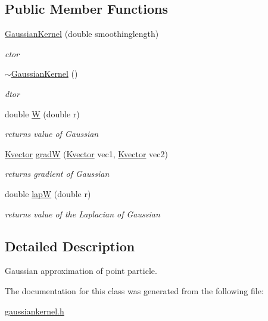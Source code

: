\subsection*{\-Public \-Member \-Functions}
\begin{DoxyCompactItemize}
\item 
\hypertarget{classGaussianKernel_a35f271df46c73b532d7610c4b374b8d5}{\hyperlink{classGaussianKernel_a35f271df46c73b532d7610c4b374b8d5}{\-Gaussian\-Kernel} (double smoothinglength)}\label{classGaussianKernel_a35f271df46c73b532d7610c4b374b8d5}

\begin{DoxyCompactList}\small\item\em ctor \end{DoxyCompactList}\item 
\hypertarget{classGaussianKernel_a15bac60eda4d2df8bf705457bec9455f}{\hyperlink{classGaussianKernel_a15bac60eda4d2df8bf705457bec9455f}{$\sim$\-Gaussian\-Kernel} ()}\label{classGaussianKernel_a15bac60eda4d2df8bf705457bec9455f}

\begin{DoxyCompactList}\small\item\em dtor \end{DoxyCompactList}\item 
\hypertarget{classGaussianKernel_ae6d613700d1d59f463094cc5c43ce97c}{double \hyperlink{classGaussianKernel_ae6d613700d1d59f463094cc5c43ce97c}{\-W} (double r)}\label{classGaussianKernel_ae6d613700d1d59f463094cc5c43ce97c}

\begin{DoxyCompactList}\small\item\em returns value of \-Gaussian \end{DoxyCompactList}\item 
\hypertarget{classGaussianKernel_a765d88e17749dddc2e3b417f8d74a217}{\hyperlink{structKvector}{\-Kvector} \hyperlink{classGaussianKernel_a765d88e17749dddc2e3b417f8d74a217}{grad\-W} (\hyperlink{structKvector}{\-Kvector} vec1, \hyperlink{structKvector}{\-Kvector} vec2)}\label{classGaussianKernel_a765d88e17749dddc2e3b417f8d74a217}

\begin{DoxyCompactList}\small\item\em returns gradient of \-Gaussian \end{DoxyCompactList}\item 
\hypertarget{classGaussianKernel_ae1233002be9c4d8f814a466056507bc0}{double \hyperlink{classGaussianKernel_ae1233002be9c4d8f814a466056507bc0}{lap\-W} (double r)}\label{classGaussianKernel_ae1233002be9c4d8f814a466056507bc0}

\begin{DoxyCompactList}\small\item\em returns value of the \-Laplacian of \-Gaussian \end{DoxyCompactList}\end{DoxyCompactItemize}


\subsection{\-Detailed \-Description}
\-Gaussian approximation of point particle. 

\-The documentation for this class was generated from the following file\-:\begin{DoxyCompactItemize}
\item 
\hyperlink{gaussiankernel_8h}{gaussiankernel.\-h}\end{DoxyCompactItemize}
